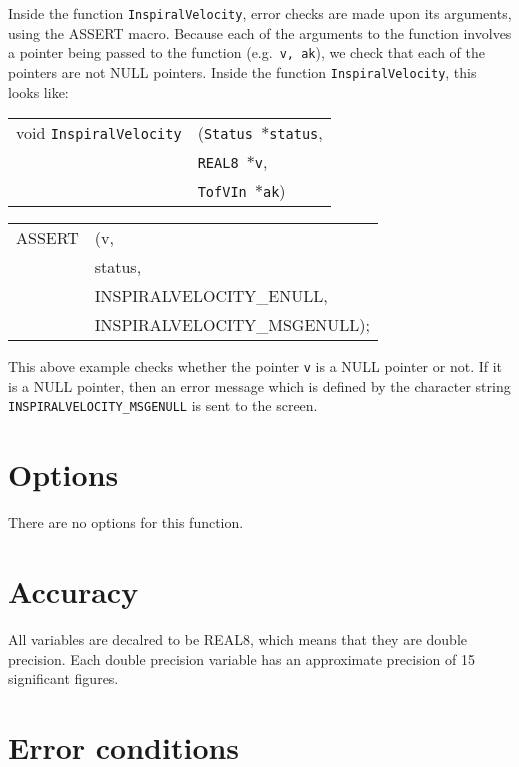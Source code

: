 \documentclass[12pt]{article}
\begin{document}
Inside the function \texttt{InspiralVelocity}, error checks are made upon its arguments, using the ASSERT macro. Because each of the arguments to the function involves a pointer being passed to the function (e.g.\ \texttt{v, ak}), we check that each of the pointers are not NULL pointers.
Inside the function \texttt{InspiralVelocity}, this looks like:

\vspace{5mm}

\begin{tabular}{ll}
void \texttt{InspiralVelocity}&(\texttt{Status $\ast$status},     \\
                                   &\texttt{REAL8 $\ast$v}, \\
                                   &\texttt{TofVIn $\ast$ak})
\end{tabular}

\vspace{5mm}

\begin{tabular}{ll}
ASSERT & (v,  \\
       &  status,    \\
       &  INSPIRALVELOCITY\_ENULL, \\
       &  INSPIRALVELOCITY\_MSGENULL);
\end{tabular}

\vspace{5mm}

This above example checks whether the pointer \texttt{v} is a NULL pointer or not. If it is a NULL pointer, then an error message which is defined by the character string \texttt{INSPIRALVELOCITY\_MSGENULL} is sent to the screen.


\section{Options}

There are no options for this function.


\section{Accuracy}

All variables are decalred to be REAL8, which means that they are double precision.
Each double precision variable has an approximate precision of 15 significant figures.


\section{Error conditions}
\end{document}
